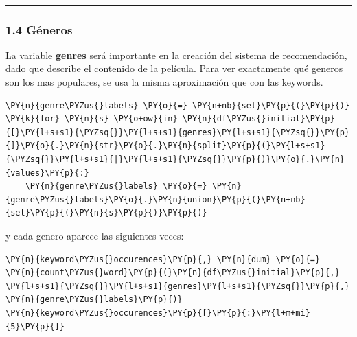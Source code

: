     { \hspace*{\fill} \\}
    
    \begin{center}\rule{0.5\linewidth}{\linethickness}\end{center}

\subsubsection{1.4 Géneros}\label{guxe9neros}

    La variable \textbf{genres} será importante en la creación del sistema
de recomendación, dado que describe el contenido de la película. Para
ver exactamente qué generos son los mas populares, se usa la misma
aproximación que con las keywords.

    \begin{tcolorbox}[breakable, size=fbox, boxrule=1pt, pad at break*=1mm,colback=cellbackground, colframe=cellborder]
\begin{Verbatim}[commandchars=\\\{\}]
\PY{n}{genre\PYZus{}labels} \PY{o}{=} \PY{n+nb}{set}\PY{p}{(}\PY{p}{)}
\PY{k}{for} \PY{n}{s} \PY{o+ow}{in} \PY{n}{df\PYZus{}initial}\PY{p}{[}\PY{l+s+s1}{\PYZsq{}}\PY{l+s+s1}{genres}\PY{l+s+s1}{\PYZsq{}}\PY{p}{]}\PY{o}{.}\PY{n}{str}\PY{o}{.}\PY{n}{split}\PY{p}{(}\PY{l+s+s1}{\PYZsq{}}\PY{l+s+s1}{|}\PY{l+s+s1}{\PYZsq{}}\PY{p}{)}\PY{o}{.}\PY{n}{values}\PY{p}{:}
    \PY{n}{genre\PYZus{}labels} \PY{o}{=} \PY{n}{genre\PYZus{}labels}\PY{o}{.}\PY{n}{union}\PY{p}{(}\PY{n+nb}{set}\PY{p}{(}\PY{n}{s}\PY{p}{)}\PY{p}{)}
\end{Verbatim}
\end{tcolorbox}

    y cada genero aparece las siguientes veces:

    \begin{tcolorbox}[breakable, size=fbox, boxrule=1pt, pad at break*=1mm,colback=cellbackground, colframe=cellborder]
\begin{Verbatim}[commandchars=\\\{\}]
\PY{n}{keyword\PYZus{}occurences}\PY{p}{,} \PY{n}{dum} \PY{o}{=} \PY{n}{count\PYZus{}word}\PY{p}{(}\PY{n}{df\PYZus{}initial}\PY{p}{,} \PY{l+s+s1}{\PYZsq{}}\PY{l+s+s1}{genres}\PY{l+s+s1}{\PYZsq{}}\PY{p}{,} \PY{n}{genre\PYZus{}labels}\PY{p}{)}
\PY{n}{keyword\PYZus{}occurences}\PY{p}{[}\PY{p}{:}\PY{l+m+mi}{5}\PY{p}{]}
\end{Verbatim}
\end{tcolorbox}

